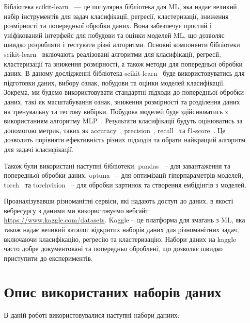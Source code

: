 Бібліотека scikit-learn~\cite{ct20} --- це популярна бібліотека для ML, яка надає великий набір інструментів для задач класифікації, регресії, кластеризації, зниження розмірності та попередньої обробки даних. Вона забезпечує простий і уніфікований інтерфейс для побудови та оцінки моделей ML, що дозволяє швидко розробляти і тестувати різні алгоритми. Основні компоненти бібліотеки scikit-learn~\cite{ct20} включають реалізовані алгоритми для класифікації, регресії, кластеризації та зниження розмірності, а також методи для попередньої обробки даних. В даному дослідженні бібліотека scikit-learn~\cite{ct20} буде використовуватись для підготовки даних, вибору ознак, побудови та оцінки моделей класифікації. Зокрема, ми будемо використовувати стандартні підходи до попередньої обробки даних, такі як масштабування ознак, зниження розмірності та розділення даних на тренувальну та тестову вибірки. Побудова моделей буде здійснюватись з використанням алгоритму MLP~\cite{ct26}. Результати класифікації будуть оцінюватись за допомогою метрик, таких як accuracy~\cite{ct6}, precision~\cite{ct6}, recall~\cite{ct7} та f1-score~\cite{ct8}. Це дозволить порівняти ефективність різних підходів та обрати найкращий алгоритм для задачі класифікації.

Також були використані наступні бібліотеки: pandas~\cite{ct21} -- для завантаження та попередньої обробки даних, optuna~\cite{ct22} -- для оптимізації гіперпараметрів моделей, torch~\cite{ct23} та torchvision~\cite{ct24} -- для обробки картинок та створення ембідінгів з моделей.

Проаналізувавши різноманітні сервіси, які надають доступ до даних, в якості вебресурсу з даними ми використовуємо вебсайт \href{https://www.kaggle.com/datasets}{https://www.kaggle.com/datasets}. Kaggle -- це платформа для змагань з ML, яка також надає великий каталог відкритих наборів даних для різноманітних задач, включаючи класифікацію, регресію та кластеризацію. Набори даних на kaggle часто добре документовані та попередньо оброблені, що дозволяє швидко приступити до експериментів.

\section{Опис використаних наборів даних}

В даній роботі використовувалися наступні набори даниих: 

